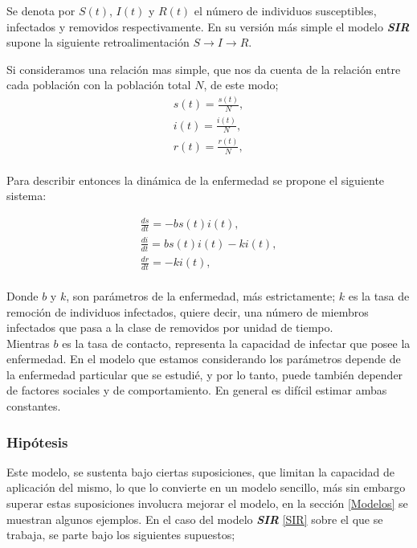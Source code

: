 \documentclass[journal]{IEEEtran}
\begin{document}
Se denota por $S(t)$, $I(t)$ y $R(t)$ el número de individuos susceptibles, infectados y removidos respectivamente.
En su versión más simple el modelo \textbf{\textit{SIR}} supone la siguiente retroalimentación $S \rightarrow I \rightarrow R$.\newline
  
Si consideramos una relación mas simple, que nos da cuenta de la relación entre cada población con la población total $N$, de este modo;
\begin{equation*}
  \begin{split}
s(t) = \frac{s(t)}{N},\\
i(t) = \frac{i(t)}{N},\\
r(t) = \frac{r(t)}{N},\\
  \end{split}
\end{equation*} 

Para describir entonces la dinámica de la enfermedad se propone el siguiente sistema:  

\begin{equation}\label{SIR}
  \begin{split}
\frac{ds}{dt} = -bs(t)i(t),\\
\frac{di}{dt} = bs(t)i(t)-ki(t),\\
\frac{dr}{dt} = -ki(t),\\
  \end{split}
\end{equation}

Donde $b$ y $k$, son parámetros de la enfermedad, más estrictamente; $k$ es la tasa de remoción de individuos infectados, quiere decir, una
número de miembros infectados que pasa a la clase de removidos por unidad de tiempo.\\ 
Mientras $b$ es la tasa de contacto, representa la capacidad de infectar que posee la enfermedad. En el modelo que estamos considerando los parámetros depende de la enfermedad
particular que se estudié, y por lo tanto, puede también depender de factores sociales y
de comportamiento. En general es difícil estimar ambas constantes.

\subsubsection{Hipótesis}
Este modelo, se sustenta bajo ciertas suposiciones, que limitan la capacidad de aplicación del mismo, lo que lo convierte en un modelo sencillo,
más sin embargo superar estas suposiciones involucra mejorar el modelo, en la sección \ref{Modelos} se muestran algunos ejemplos. En el caso del modelo \textbf{\textit{SIR}} \ref{SIR}
sobre el que se trabaja, se parte bajo los siguientes supuestos;
\end{document}
